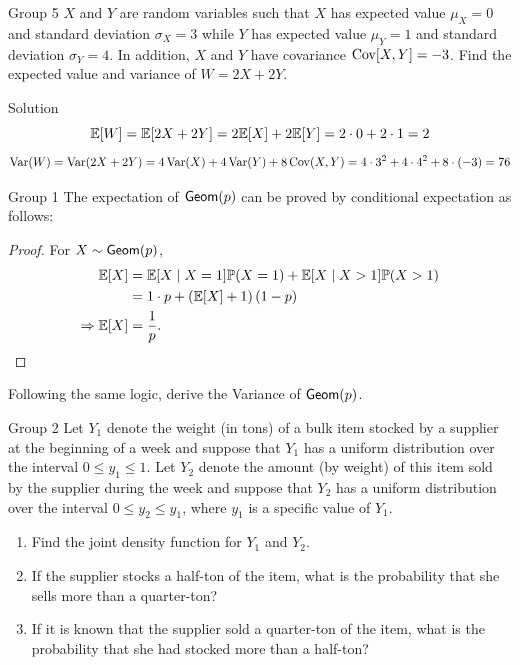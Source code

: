 \documentclass{article}
\begin{document}
\begin{problem}
    {Group 5}
    $X$ and $Y$ are random variables such that $X$ has expected value $\mu_X = 0$ and standard deviation $\sigma_X = 3$ while $Y$ has expected value $\mu_Y = 1$ and standard deviation $\sigma_Y = 4$. In addition, $X$ and $Y$ have covariance $\mathop{\mathrm{Cov}}\nolimits[X, Y] = -3$. Find the expected value and variance of $W = 2X+2Y$.
\end{problem}

\begin{solution}
    {Solution}
    \[
        \E{W} = \E{2X+2Y} = 2\E{X}+2\E{Y} = 2\cdot 0+2\cdot 1 = 2
    \]
    \[
        \mathop{\mathrm{Var}}\nolimits(W) = \mathop{\mathrm{Var}}\nolimits(2X+2Y) = 4\mathop{\mathrm{Var}}\nolimits(X)+4\mathop{\mathrm{Var}}\nolimits(Y)+8\mathop{\mathrm{Cov}}\nolimits(X,Y) = 4\cdot 3^2+4\cdot 4^2+8\cdot (-3) = 76
    \]
\end{solution}
\fi
\begin{problem}
    {Group 1}
    The expectation of $\mathsf{Geom}(p)$ can be proved by conditional expectation as follows:
    \begin{proof}
        For $X\sim\mathsf{Geom}(p)$,
        \begin{align*}
            \E{X}
            &= \condE{X}{X=1}\P{X=1}+\condE{X}{X>1}\P{X>1}\\
            &= 1\cdot p + \left(\E{X}+1\right)(1-p)\\
            \Rightarrow
            \E{X} &= \frac{1}{p}.
        \end{align*}
    \end{proof}
    Following the same logic, derive the Variance of $\mathsf{Geom}(p)$.
\end{problem}

\begin{problem}
    {Group 2}
    Let $Y_1$ denote the weight (in tons) of a bulk item stocked by a supplier at the beginning of a week and suppose that $Y_1$ has a uniform distribution over the interval $0 \leq y_1 \leq 1$. Let $Y_2$ denote the amount (by weight) of this item sold by the supplier during the week and suppose that $Y_2$ has a uniform distribution over the interval $0 \leq y_2 \leq y_1$, where $y_1$ is a specific value of $Y_1$.
    \begin{enumerate}
        \item Find the joint density function for $Y_1$ and $Y_2$.
        \item If the supplier stocks a half-ton of the item, what is the probability that she sells more than a quarter-ton?
        \item If it is known that the supplier sold a quarter-ton of the item, what is the probability that she had stocked more than a half-ton?
    \end{enumerate}
\end{problem}
\end{document}
